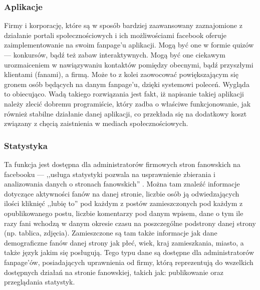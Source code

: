 \subsubsection{Aplikacje}
Firmy i korporację, które są w sposób bardziej zaawansowany zaznajomione z działanie portali społecznościowych i ich możliwościami facebook oferuje zaimplementowanie na swoim fanpage'u aplikacji. Mogą być one w formie quizów --- konkursów, bądź też zabaw interaktywnych. Mogą być one ciekawym urozmaiceniem w nawiązywaniu kontaktów pomiędzy obecnymi, bądź przyszłymi klientami (fanami), a firmą. Może to z kolei zaowocować powiększającym się gronem osób będących na danym fanpage’u, dzięki systemowi poleceń. Wygląda to obiecująco. Wadą takiego rozwiązania jest fakt, iż napisanie takiej aplikacji należy zlecić dobremu programiście, który zadba o właściwe funkcjonowanie, jak również stabilne działanie danej aplikacji, co przekłada się na dodatkowy koszt związany z chęcią zaistnienia w mediach społecznościowych.


\subsubsection{Statystyka}
Ta funkcja jest dostępna dla administratorów firmowych stron fanowskich na facebooku --- ,,usługa statystyki pozwala na usprawnienie zbierania i analizowania danych o stronach fanowskich'' \cite{url:hatalska-mikroblogi}. Można tam znaleźć informacje dotyczące aktywności fanów na danej stronie, liczbie osób ją odwiedzających ilości kliknięć ,,lubię to'' pod każdym z postów zamieszczonych pod każdym z opublikowanego postu, liczbie komentarzy pod danym wpisem, dane o tym ile razy fani wchodzą w danym okresie czasu na poszczególne podstrony danej strony (np. tablica, zdjęcia). Zamieszczone są tam także informacje jak dane demograficzne fanów danej strony jak płeć, wiek, kraj zamieszkania, miasto, a także język jakim się posługują. Tego typu dane są dostępne dla administratorów fanpage'ów, posiadających uprawnienia od firmy, którą reprezentują do wszelkich dostępnych działań na stronie fanowskiej, takich jak: publikowanie oraz przeglądania statystyk.

